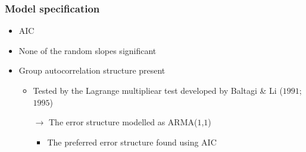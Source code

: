 \documentclass{beamer}              %
\begin{document}




\begin{frame}

\frametitle{Model specification}\label{spec} 

\begin{itemize}
\item AIC
\item None of the random slopes significant
\item Group autocorrelation structure present

\begin{itemize}
\item Tested by the Lagrange multipliear test developed by Baltagi \& Li ($1991$; $1995$)
\item[$\boldsymbol{\rightarrow}$] The error structure modelled as ARMA($1$,$1$) 
\begin{itemize}
\item The preferred error structure found using AIC
\end{itemize}
\end{itemize}
 
\end{itemize}

\end{frame}



\end{document}
